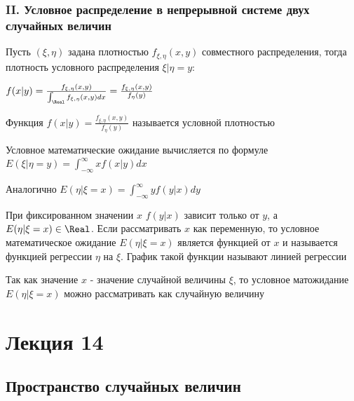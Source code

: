 \documentclass[12pt]{article}
\begin{document}
    \subsubsection{II. Условное распределение в непрерывной системе двух случайных величин}

    \hypertarget{conditionaldistributionincontinuoussystem}{}

    Пусть $(\xi, \eta)$ задана плотностью $f_{\xi, \eta}(x, y)$ совместного распределения, тогда плотность 
    условного распределения $\xi | \eta = y$: 

    $f(x | y) = \frac{f_{\xi, \eta}(x, y)}{\int_\Real f_{\xi, \eta}(x, y)dx} = \frac{f_{\xi, \eta}(x, y)}{f_{\eta}(y)}$

    \Def Функция $f(x | y) = \frac{f_{\xi, \eta}(x, y)}{f_{\eta}(y)}$ называется условной плотностью

    \Def Условное математические ожидание вычисляется по формуле $E(\xi | \eta = y) = \int_{-\infty}^\infty xf(x | y)dx$

    Аналогично $E(\eta | \xi = x) = \int_{-\infty}^\infty yf(y | x)dy$

    \Nota При фиксированном значении $x$ $f(y | x)$ зависит только от $y$, а $E(\eta | \xi = x) \in \Real$. 
    Если рассматривать $x$ как переменную, то условное математическое ожидание $E(\eta | \xi = x)$ является
    функцией от $x$ и называется функцией регрессии $\eta$ на $\xi$. График такой функции называют линией регрессии

    \Nota Так как значение $x$ - значение случайной величины $\xi$, то условное матожидание $E(\eta | \xi = x)$ 
    можно рассматривать как случайную величину






\section{Лекция 14}

\subsection{Пространство случайных величин}
\end{document}
